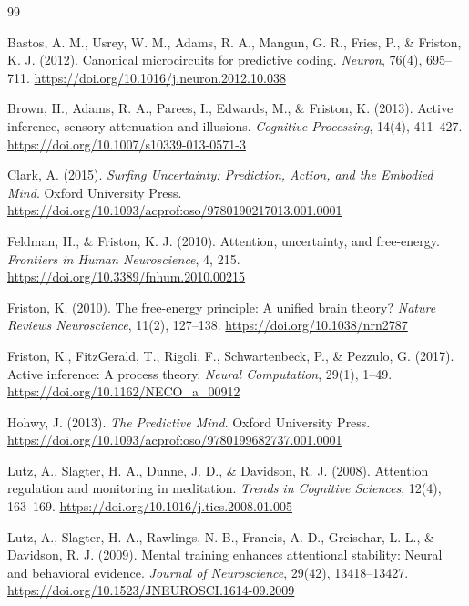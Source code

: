 \documentclass[11pt,a4paper]{article}
\begin{document}
\begin{thebibliography}{99}

Bastos, A. M., Usrey, W. M., Adams, R. A., Mangun, G. R., Fries, P., \& Friston, K. J. (2012).
Canonical microcircuits for predictive coding.
\textit{Neuron}, 76(4), 695--711.
\url{https://doi.org/10.1016/j.neuron.2012.10.038}

Brown, H., Adams, R. A., Parees, I., Edwards, M., \& Friston, K. (2013).
Active inference, sensory attenuation and illusions.
\textit{Cognitive Processing}, 14(4), 411--427.
\url{https://doi.org/10.1007/s10339-013-0571-3}

Clark, A. (2015).
\textit{Surfing Uncertainty: Prediction, Action, and the Embodied Mind}.
Oxford University Press.
\url{https://doi.org/10.1093/acprof:oso/9780190217013.001.0001}

Feldman, H., \& Friston, K. J. (2010).
Attention, uncertainty, and free-energy.
\textit{Frontiers in Human Neuroscience}, 4, 215.
\url{https://doi.org/10.3389/fnhum.2010.00215}

Friston, K. (2010).
The free-energy principle: A unified brain theory?
\textit{Nature Reviews Neuroscience}, 11(2), 127--138.
\url{https://doi.org/10.1038/nrn2787}

Friston, K., FitzGerald, T., Rigoli, F., Schwartenbeck, P., \& Pezzulo, G. (2017).
Active inference: A process theory.
\textit{Neural Computation}, 29(1), 1--49.
\url{https://doi.org/10.1162/NECO_a_00912}

Hohwy, J. (2013).
\textit{The Predictive Mind}.
Oxford University Press.
\url{https://doi.org/10.1093/acprof:oso/9780199682737.001.0001}

Lutz, A., Slagter, H. A., Dunne, J. D., \& Davidson, R. J. (2008).
Attention regulation and monitoring in meditation.
\textit{Trends in Cognitive Sciences}, 12(4), 163--169.
\url{https://doi.org/10.1016/j.tics.2008.01.005}

Lutz, A., Slagter, H. A., Rawlings, N. B., Francis, A. D., Greischar, L. L., \& Davidson, R. J. (2009).
Mental training enhances attentional stability: Neural and behavioral evidence.
\textit{Journal of Neuroscience}, 29(42), 13418--13427.
\url{https://doi.org/10.1523/JNEUROSCI.1614-09.2009}


\end{thebibliography}
\end{document}
